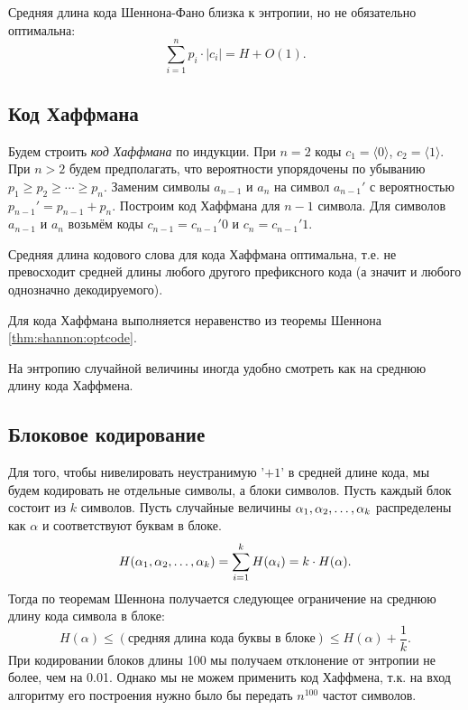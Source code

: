 \documentclass[12pt]{article}
\begin{document}
\begin{theorem}[Шеннон]
    Средняя длина кода Шеннона-Фано близка к энтропии, но не обязательно
    оптимальна:
    \[
        \sum_{i=1}^n p_i\cdot |c_i| = H + O(1). 
    \]
\end{theorem}
\subsection{Код Хаффмана}
\begin{definition}
    Будем строить \emph{код Хаффмана} по индукции. При $n = 2$ коды $c_1 =
    \langle0\rangle$, $c_2 = \langle1\rangle$. При $n > 2$ будем предполагать,
    что вероятности упорядочены по убыванию $p_1\ge p_2\ge\dotsb\ge p_n$.
    Заменим символы $a_{n-1}$ и $a_n$ на символ $a_{n-1}'$ с вероятностью
    $p_{n-1}' = p_{n-1} + p_n$. Построим код Хаффмана для $n-1$ символа.
    Для символов $a_{n-1}$ и $a_n$ возьмём коды $c_{n-1} = c_{n-1}'0$ и
    $c_{n} = c_{n-1}'1$.
\end{definition}
\begin{lemma}
    Средняя длина кодового слова для кода Хаффмана оптимальна, т.е. не превосходит средней длины
    любого другого префиксного кода (а значит и любого однозначно
    декодируемого).    
\end{lemma}
\begin{corollary}
    Для кода Хаффмана выполняется неравенство из теоремы Шеннона \ref{thm:shannon:optcode}.
\end{corollary}
\begin{remark}
    На энтропию случайной величины иногда удобно смотреть как на среднюю длину
    кода Хаффмена.
\end{remark}

\subsection{Блоковое кодирование}
Для того, чтобы нивелировать неустранимую '$+1$' в средней длине кода, мы будем
кодировать не отдельные символы, а блоки символов.
Пусть каждый блок состоит из $k$ символов. Пусть случайные величины ${\alpha}_1,{\alpha}_2,\dotsc,{\alpha}_{k}$
распределены как $\alpha$ и соответствуют буквам в блоке. 
\[
    H({\alpha}_1,{\alpha}_2,\dotsc,{\alpha}_{k}) = \sum_{i=1}^k H(\alpha_i) = k\cdot H(\alpha).
\]
Тогда по теоремам Шеннона получается
следующее ограничение на среднюю длину кода символа в блоке:               
\[
    H(\alpha)\le (\text{средняя длина кода буквы в блоке})\le H(\alpha) +
    \frac{1}{k}.
\]
При кодировании блоков длины 100 мы получаем отклонение от энтропии не
более, чем на 0.01. Однако мы не можем применить код Хаффмена, т.к. на
вход алгоритму его построения нужно было бы передать $n^{100}$ частот
символов.
\end{document}
